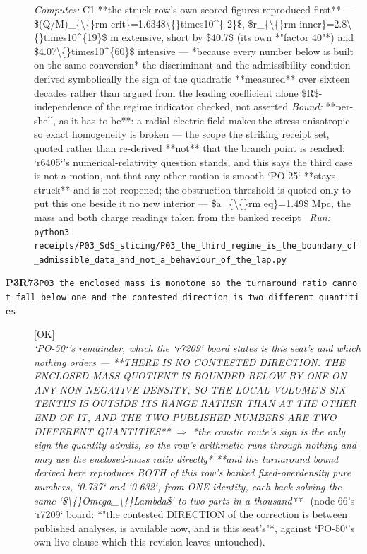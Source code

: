 \begin{description}
\emph{Computes:} C1 **the struck row's own scored figures reproduced first** --- \$(Q/M)\_\{\textbackslash\{\}rm crit\}=1.6348\textbackslash\{\}times10\textasciicircum{}\{-2\}\$, \$r\_\{\textbackslash\{\}rm inner\}=2.8\textbackslash\{\}times10\textasciicircum{}\{19\}\$ m extensive, short by \$40.7\$ (its own *"factor 40"*) and \$4.07\textbackslash\{\}times10\textasciicircum{}\{60\}\$ intensive --- *because every number below is built on the same conversion*  the discriminant and the admissibility condition derived symbolically  the sign of the quadratic **measured** over sixteen decades rather than argued from the leading coefficient alone  \$R\$-independence of the regime indicator checked, not asserted
 \emph{Bound:}  **per-shell, as it has to be**: a radial electric field makes the stress anisotropic so exact homogeneity is broken --- the scope the striking receipt set, quoted rather than re-derived  **not** that the branch point is reached: `r6405`'s numerical-relativity question stands, and this says the third case is not a motion, not that any other motion is smooth  `PO-25` **stays struck** and is not reopened; the obstruction threshold is quoted only to put this one beside it  no new interior --- \$a\_\{\textbackslash\{\}rm eq\}=1.49\$ Mpc, the mass and both charge readings taken from the banked receipt
\ \emph{Run:} \texttt{python3 receipts/P03\_SdS\_slicing/P03\_the\_third\_regime\_is\_the\_boundary\_of\_admissible\_data\_and\_not\_a\_behaviour\_of\_the\_lap.py}
\item[\rcptlabel{P03_the_enclosed_mass_is_monotone_so_the_turnaround_ratio_cannot_fall_below_one_and_the_contested_direction_is_two_different_quantities}{P3R73}\textbf{P3R73}\quad\texttt{P03\_the\_enclosed\_mass\_is\_monotone\_so\_the\_turnaround\_ratio\_cannot\_fall\_below\_one\_and\_the\_contested\_direction\_is\_two\_different\_quantities}]\hfill\textsf{[OK]}\\
\textit{`PO-50`'s remainder, which the `r7209` board states is this seat's and which nothing orders ---  **THERE IS NO CONTESTED DIRECTION. THE ENCLOSED-MASS QUOTIENT IS BOUNDED BELOW BY ONE ON ANY NON-NEGATIVE DENSITY, SO THE LOCAL VOLUME'S SIX TENTHS IS OUTSIDE ITS RANGE RATHER THAN AT THE OTHER END OF IT, AND THE TWO PUBLISHED NUMBERS ARE TWO DIFFERENT QUANTITIES** \ensuremath{\Rightarrow} *the caustic route's sign is the only sign the quantity admits, so the row's arithmetic runs through nothing and may use the enclosed-mass ratio directly*  **and the turnaround bound derived here reproduces BOTH of this row's banked fixed-overdensity pure numbers, `0.737` and `0.632`, from ONE identity, each back-solving the same `\$\textbackslash\{\}Omega\_\textbackslash\{\}Lambda\$` to two parts in a thousand**} \ (node 66's `r7209` board: *"the contested DIRECTION of the correction is between published analyses, is available now, and is this seat's"*, against `PO-50`'s own live clause which this revision leaves untouched). 

\end{description}
